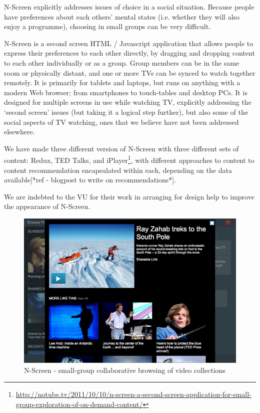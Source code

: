 \documentclass{notube}
\begin{document}
N-Screen explicitly addresses issues of choice in a social situation. Because people have preferences about each others' mental states (i.e. whether they will also enjoy a programme), choosing in small groups can be very difficult. 

N-Screen is a second screen HTML / Javascript application that allows people to express their preferences to each other directly, by dragging and dropping content to each other individually or as a group. Group members can be in the same room or physically distant, and one or more TVs can be synced to watch together remotely. It is primarily for tablets and laptops, but runs on anything with a modern Web browser; from smartphones to touch-tables and desktop PCs. It is designed for multiple screens in use while watching TV, explicitly addressing the `second screen' issues (but taking it a logical step further), but also some of the social aspects of TV watching, ones that we believe have not been addressed elsewhere.

We have made three different version of N-Screen with three different sets of content: Redux, TED Talks, and iPlayer\footnote{\url{http://notube.tv/2011/10/10/n-screen-a-second-screen-application-for-small-group-exploration-of-on-demand-content/}}, with different approaches to content to content recommendation encapsulated within each, depending on the data available[*ref - blogpost to write on recommendations*].

We are indebted to the VU for their work in arranging for design help to improve the appearance of N-Screen.

\begin{figure}[htbp]
\begin{center}
\includegraphics[width=6in]{images/nscreen.png}
\caption{N-Screen - small-group collaborative browsing of video collections} \label{fig:nscreen}
\end{center}
\end{figure} 
\end{document}
